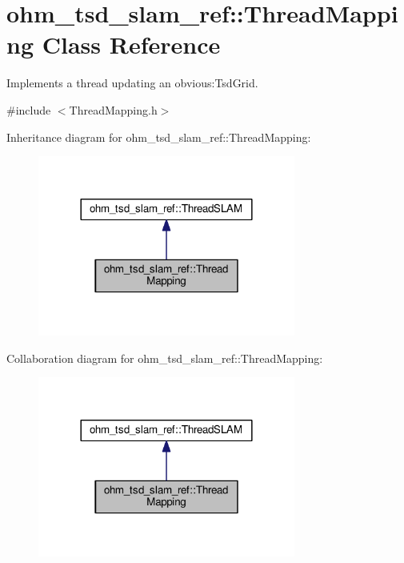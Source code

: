 \hypertarget{classohm__tsd__slam__ref_1_1ThreadMapping}{\section{ohm\-\_\-tsd\-\_\-slam\-\_\-ref\-:\-:Thread\-Mapping Class Reference}
\label{classohm__tsd__slam__ref_1_1ThreadMapping}
}


Implements a thread updating an obvious\-:Tsd\-Grid.  




{\ttfamily \#include $<$Thread\-Mapping.\-h$>$}



Inheritance diagram for ohm\-\_\-tsd\-\_\-slam\-\_\-ref\-:\-:Thread\-Mapping\-:\nopagebreak
\begin{figure}[H]
\begin{center}
\leavevmode
\includegraphics[width=240pt]{classohm__tsd__slam__ref_1_1ThreadMapping__inherit__graph}
\end{center}
\end{figure}


Collaboration diagram for ohm\-\_\-tsd\-\_\-slam\-\_\-ref\-:\-:Thread\-Mapping\-:\nopagebreak
\begin{figure}[H]
\begin{center}
\leavevmode
\includegraphics[width=240pt]{classohm__tsd__slam__ref_1_1ThreadMapping__coll__graph}
\end{center}
\end{figure}
